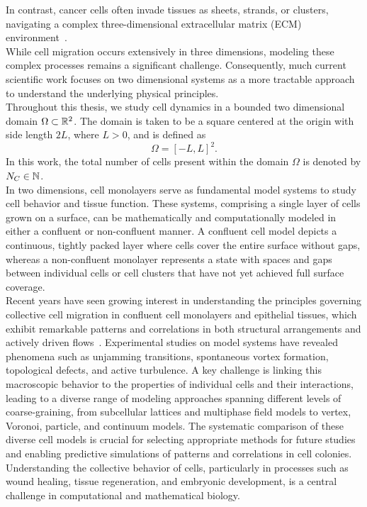 In contrast, cancer cells often invade tissues as sheets, strands, or clusters, navigating a complex three-dimensional extracellular matrix (ECM) environment~\cite{friedl2009, cai2014, clark2015}. \\
While cell migration occurs extensively in three dimensions, modeling these complex processes remains a significant challenge. 
Consequently, much current scientific work focuses on two dimensional systems as a more tractable approach to understand the underlying physical principles. \\
Throughout this thesis, we study cell dynamics in a bounded two dimensional domain $\Omega \subset \mathbb{R}^2$. 
The domain is taken to be a square centered at the origin with side length $2L$, where $L > 0$, and is defined as
\[
\Omega = [-L, L]^2.
\]
In this work, the total number of cells present within the domain $\Omega$ is denoted by $N_C \in \mathbb{N}$. \\
In two dimensions, cell monolayers serve as fundamental model systems to study cell behavior and tissue function. 
These systems, comprising a single layer of cells grown on a surface, can be mathematically and computationally modeled in either a confluent or non-confluent manner. 
A confluent cell model depicts a continuous, tightly packed layer where cells cover the entire surface without gaps, whereas a non-confluent monolayer represents a state with spaces and gaps between individual cells or cell clusters that have not yet achieved full surface coverage. \\
Recent years have seen growing interest in understanding the principles governing collective cell migration in confluent cell monolayers and epithelial tissues, which exhibit remarkable patterns and correlations in both structural arrangements and actively driven flows~\cite{wenzel2021}. 
Experimental studies on model systems have revealed phenomena such as unjamming transitions, spontaneous vortex formation, topological defects, and active turbulence. 
A key challenge is linking this macroscopic behavior to the properties of individual cells and their interactions, leading to a diverse range of modeling approaches spanning different levels of coarse-graining, from subcellular lattices and multiphase field models to vertex, Voronoi, particle, and continuum models. 
The systematic comparison of these diverse cell models is crucial for selecting appropriate methods for future studies and enabling predictive simulations of patterns and correlations in cell colonies. \\
Understanding the collective behavior of cells, particularly in processes such as wound healing, tissue regeneration, and embryonic development, is a central challenge in computational and mathematical biology. 
